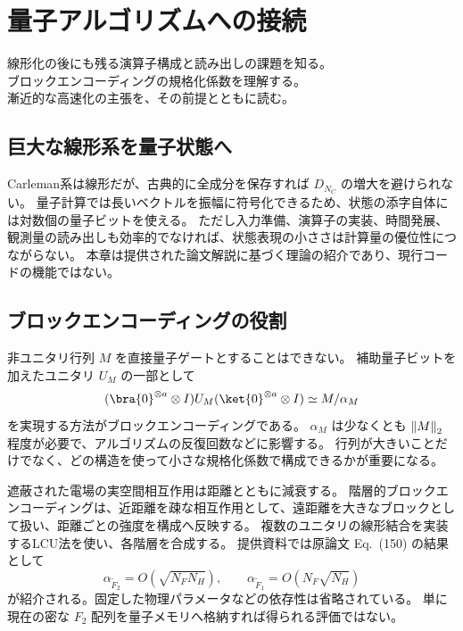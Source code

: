 \chapter{量子アルゴリズムへの接続}
\begin{chaptergoal}
\cgitem 線形化の後にも残る演算子構成と読み出しの課題を知る。\\
\cgitem ブロックエンコーディングの規格化係数を理解する。\\
\cgitem 漸近的な高速化の主張を、その前提とともに読む。
\end{chaptergoal}

\section{巨大な線形系を量子状態へ}
Carleman系は線形だが、古典的に全成分を保存すれば $D_{N_C}$ の増大を避けられない。
量子計算では長いベクトルを振幅に符号化できるため、状態の添字自体には対数個の量子ビットを使える。
ただし入力準備、演算子の実装、時間発展、観測量の読み出しも効率的でなければ、状態表現の小ささは計算量の優位性につながらない。
本章は提供された論文解説に基づく理論の紹介であり、現行コードの機能ではない。

\section{ブロックエンコーディングの役割}
非ユニタリ行列 $M$ を直接量子ゲートとすることはできない。
補助量子ビットを加えたユニタリ $U_M$ の一部として
\begin{equation}
(\bra{0}^{\otimes a}\otimes I)U_M(\ket{0}^{\otimes a}\otimes I)
\simeq M/\alpha_M
\end{equation}
を実現する方法がブロックエンコーディングである。
$\alpha_M$ は少なくとも $\left\lVert M\right\rVert_2$ 程度が必要で、アルゴリズムの反復回数などに影響する。
行列が大きいことだけでなく、どの構造を使って小さな規格化係数で構成できるかが重要になる。

遮蔽された電場の実空間相互作用は距離とともに減衰する。
階層的ブロックエンコーディングは、近距離を疎な相互作用として、遠距離を大きなブロックとして扱い、距離ごとの強度を構成へ反映する。
複数のユニタリの線形結合を実装するLCU法を使い、各階層を合成する。
提供資料では原論文 Eq.~(150) の結果として
\begin{equation}
\alpha_{\widetilde F_2}=O(\sqrt{N_FN_H}),\qquad
\alpha_{\widetilde F_1}=O(N_F\sqrt{N_H})
\end{equation}
が紹介される。固定した物理パラメータなどの依存性は省略されている。
単に現在の密な $F_2$ 配列を量子メモリへ格納すれば得られる評価ではない。

